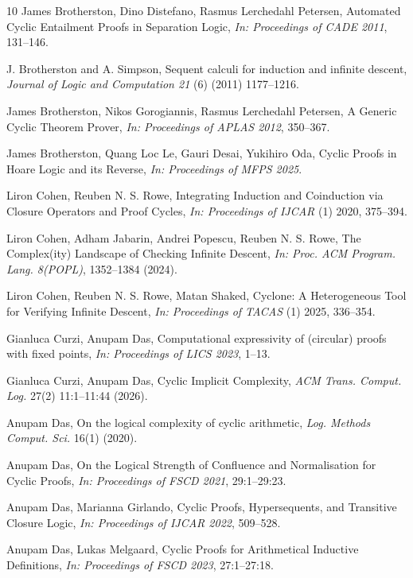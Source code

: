 \begin{thebibliography}{10}
James Brotherston, Dino Distefano, Rasmus Lerchedahl Petersen,
Automated Cyclic Entailment Proofs in Separation Logic,
{\em In: Proceedings of CADE 2011}, 131--146.

J. Brotherston and A. Simpson,
Sequent calculi for induction and infinite descent,
{\em Journal of Logic and Computation 21} (6) (2011) 1177--1216.

James Brotherston, Nikos Gorogiannis, Rasmus Lerchedahl Petersen,
A Generic Cyclic Theorem Prover,
{\em In: Proceedings of APLAS 2012}, 350--367.

James Brotherston, Quang Loc Le, Gauri Desai, Yukihiro Oda,
Cyclic Proofs in Hoare Logic and its Reverse,
{\em In: Proceedings of MFPS 2025}.

Liron Cohen, Reuben N. S. Rowe,
Integrating Induction and Coinduction via Closure Operators and Proof Cycles,
{\em In: Proceedings of IJCAR} (1) 2020, 375--394.

Liron Cohen, Adham Jabarin, Andrei Popescu, Reuben N. S. Rowe,
The Complex(ity) Landscape of Checking Infinite Descent,
{\em In: Proc. ACM Program. Lang. 8(POPL)}, 1352--1384 (2024).

Liron Cohen, Reuben N. S. Rowe, Matan Shaked,
Cyclone: A Heterogeneous Tool for Verifying Infinite Descent,
{\em In: Proceedings of TACAS} (1) 2025, 336--354.

Gianluca Curzi, Anupam Das,
Computational expressivity of (circular) proofs with fixed points,
{\em In: Proceedings of LICS 2023}, 1--13.

Gianluca Curzi, Anupam Das,
Cyclic Implicit Complexity,
{\em ACM Trans. Comput. Log.} 27(2) 11:1--11:44 (2026).

Anupam Das,
On the logical complexity of cyclic arithmetic,
{\em Log. Methods Comput. Sci.} 16(1) (2020).

Anupam Das,
On the Logical Strength of Confluence and Normalisation for Cyclic Proofs,
{\em In: Proceedings of FSCD 2021}, 29:1--29:23.

Anupam Das, Marianna Girlando,
Cyclic Proofs, Hypersequents, and Transitive Closure Logic,
{\em In: Proceedings of IJCAR 2022}, 509--528.

Anupam Das, Lukas Melgaard,
Cyclic Proofs for Arithmetical Inductive Definitions, {\em In: Proceedings of FSCD 2023}, 27:1--27:18.


\end{thebibliography}
